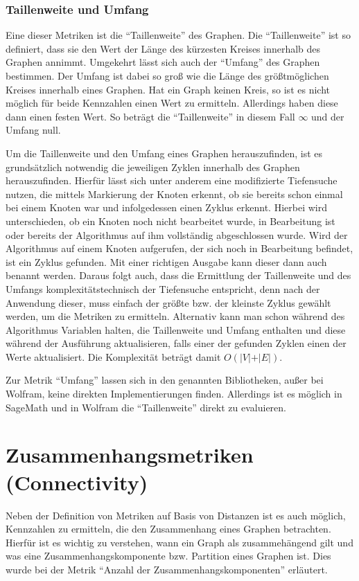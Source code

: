 \documentclass[a4paper,12pt,ngerman,chapterprefix=false,listof=totoc,bibliography=totoc]{scrreprt}
\begin{document}
\subsubsection*{Taillenweite und Umfang}
{
Eine dieser Metriken ist die "`Taillenweite"' des Graphen. Die "`Taillenweite"' ist so definiert, dass sie den Wert der Länge des kürzesten Kreises innerhalb des Graphen annimmt. Umgekehrt lässt sich auch der "`Umfang"' des Graphen bestimmen. Der Umfang ist dabei so groß wie die Länge des größtmöglichen Kreises innerhalb eines Graphen. Hat ein Graph keinen Kreis, so ist es nicht möglich für beide Kennzahlen einen Wert zu ermitteln. Allerdings haben diese dann einen festen Wert. So beträgt die "`Taillenweite"' in diesem Fall \(\infty\) und der Umfang null. \cite{diestel_graphentheorie_2000}

Um die Taillenweite und den Umfang eines Graphen herauszufinden, ist es grundsätzlich notwendig die jeweiligen Zyklen innerhalb des Graphen herauszufinden. Hierfür lässt sich unter anderem eine modifizierte Tiefensuche nutzen, die mittels Markierung der Knoten erkennt, ob sie bereits schon einmal bei einem Knoten war und infolgedessen einen Zyklus erkennt. Hierbei wird unterschieden, ob ein Knoten noch nicht bearbeitet wurde, in Bearbeitung ist oder bereits der Algorithmus auf ihm vollständig abgeschlossen wurde. Wird der Algorithmus auf einem Knoten aufgerufen, der sich noch in Bearbeitung befindet, ist ein Zyklus gefunden. Mit einer richtigen Ausgabe kann dieser dann auch benannt werden. Daraus folgt auch, dass die Ermittlung der Taillenweite und des Umfangs komplexitätstechnisch der Tiefensuche entspricht, denn nach der Anwendung dieser, muss einfach der größte bzw. der kleinste Zyklus gewählt werden, um die Metriken zu ermitteln. Alternativ kann man schon während des Algorithmus Variablen halten, die Taillenweite und Umfang enthalten und diese während der Ausführung aktualisieren, falls einer der gefunden Zyklen einen der Werte aktualisiert. Die Komplexität beträgt damit \(O(\vert V\vert +\vert E\vert)\). \cite{knebl_algorithmen_2019,vocking_taschenbuch_2008}

Zur Metrik "`Umfang"' lassen sich in den genannten Bibliotheken, außer bei Wolfram, keine direkten Implementierungen finden. Allerdings ist es möglich in SageMath und in Wolfram die "`Taillenweite"' direkt zu evaluieren. \cite{sagemath_graph_2020,wolfram_wolfram_2020}
}
\section{Zusammenhangsmetriken (Connectivity)}
{
Neben der Definition von Metriken auf Basis von Distanzen ist es auch möglich, Kennzahlen zu ermitteln, die den Zusammenhang eines Graphen betrachten. Hierfür ist es wichtig zu verstehen, wann ein Graph als zusammehängend gilt und was eine Zusammenhangskomponente bzw. Partition eines Graphen ist. Dies wurde bei der Metrik "`Anzahl der Zusammenhangskomponenten"' erläutert.
}
\end{document}
